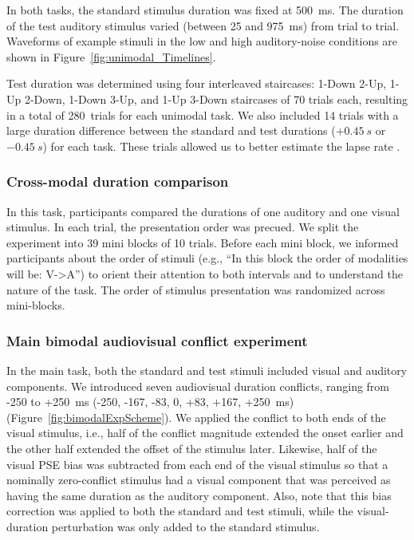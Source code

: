 \documentclass{jov}
\providecommand{\citep}[1]{\cite{#1}}
\begin{document}
In both tasks, the standard stimulus duration was fixed at 500~ms. The duration of the test auditory stimulus varied (between 25 and 975~ms) from trial to trial. Waveforms of example stimuli in the low and high auditory-noise conditions are shown in Figure~\ref{fig:unimodal_Timelines}.

Test duration was determined  using four interleaved staircases: 1-Down 2-Up, 1-Up 2-Down, 1-Down 3-Up, and 1-Up 3-Down staircases of 70 trials each, resulting in a total of 280~trials for each unimodal task. We also included 14 trials with a large duration difference between the standard and test durations ($+0.45~s$ or $-0.45~s$) for each task. These trials allowed us to better estimate the lapse rate \citep{prins2012psychometric}.


\subsubsection{Cross-modal duration comparison}
In this task, participants compared the durations of one auditory and one visual stimulus. In each trial, the presentation order was precued. We split the experiment into 39 mini blocks of 10 trials. Before each mini block, we informed participants about the order of stimuli (e.g., ``In this block the order of modalities will be: V->A'') to orient their attention to both intervals and to understand the nature of the task. The order of stimulus presentation was randomized across mini-blocks.


\subsubsection{Main bimodal audiovisual conflict experiment}

In the main task, both the standard and test stimuli included visual and auditory components. We introduced seven audiovisual duration conflicts, ranging from -250 to +250~ms (-250, -167, -83, 0, +83, +167, +250~ms) (Figure~\ref{fig:bimodalExpScheme}). We applied the conflict to both ends of the visual stimulus, i.e., half of the conflict magnitude extended the onset earlier and the other half extended the offset of the stimulus later. Likewise, half of the visual PSE bias was subtracted from each end of the visual stimulus so that a nominally zero-conflict stimulus had a visual component that was perceived as having the same duration as the auditory component. Also, note that this bias correction was applied to both the standard and test stimuli, while the visual-duration perturbation was only added to the standard stimulus.
\end{document}
